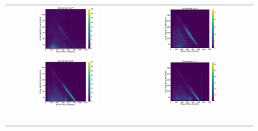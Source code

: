 \begin{figure}[ht]
	\centering
    \begin{tabular}{c c}
        \includegraphics[width=0.49\textwidth]{images/kali_szint_Streuwinkel_70_v2.png} & \includegraphics[width=0.49\textwidth]{images/kali_szint_Streuwinkel_60_v2.png} \\ \includegraphics[width=0.49\textwidth]{images/kali_szint_Streuwinkel_50_v2.png} & \includegraphics[width=0.49\textwidth]{images/kali_szint_Streuwinkel_40_v2.png} \\\

\end{tabular}
\end{figure}
